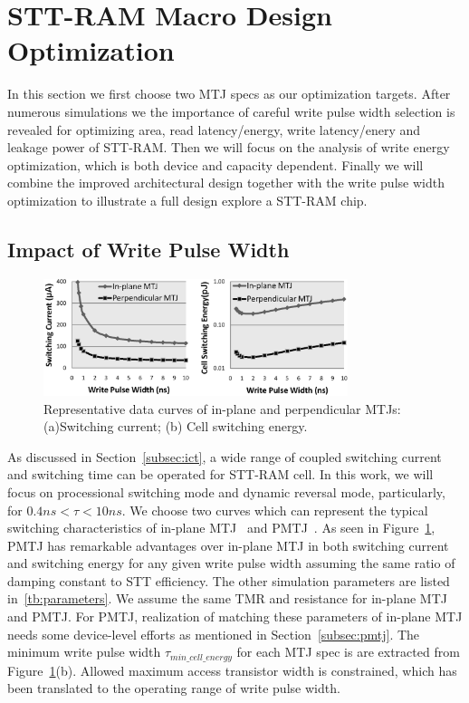 \section{STT-RAM Macro Design Optimization} \label{sec:opt}
In this section we first choose two MTJ specs as our optimization targets. After numerous simulations we the importance of careful write pulse width selection is revealed for optimizing area, read latency/energy, write latency/enery and leakage power of STT-RAM. Then we will focus on the analysis of write energy optimization, which is both device and capacity dependent. Finally we will combine the improved architectural design together with the write pulse width optimization to illustrate a full design explore a STT-RAM chip.

\subsection{Impact of Write Pulse Width}

\begin{figure}[t]
  \centering
  \includegraphics[width=3.5in]{fig/MTJSpec.eps}
  \caption{Representative data curves of in-plane and perpendicular MTJs: (a)Switching current; (b) Cell switching energy.}
  \label{fig:specs}
\end{figure}

As discussed in Section~\ref{subsec:ict}, a wide range of coupled switching current and switching time can be operated for STT-RAM cell. In this work, we will focus on processional switching mode and dynamic reversal mode, particularly, for $0.4ns < \tau < 10ns$. We choose two curves which can represent the typical switching characteristics of in-plane MTJ~\cite{STTRAM:Qualcomm09} and PMTJ~\cite{PMTJ:Toshiba08}. As seen in Figure~\ref{fig:specs}, PMTJ has remarkable advantages over in-plane MTJ in both switching current and switching energy for any given write pulse width assuming the same ratio of damping constant to STT efficiency. The other simulation parameters are listed in~\ref{tb:parameters}. We assume the same TMR and resistance for in-plane MTJ and PMTJ. For PMTJ, realization of matching these parameters of in-plane MTJ needs some device-level efforts as mentioned in Section~\ref{subsec:pmtj}. The minimum write pulse width $\tau_{min\_cell\_energy}$ for each MTJ spec is are extracted from Figure~\ref{fig:specs}(b). Allowed maximum access transistor width is constrained, which has been translated to the operating range of write pulse width.

